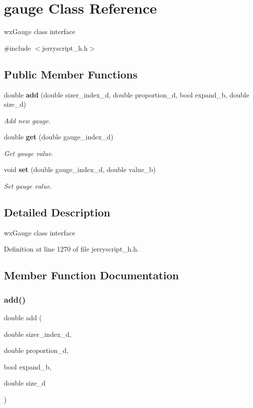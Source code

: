 \section{gauge Class Reference}
\label{classgauge}


wx\+Gauge class interface  




{\ttfamily \#include $<$jerryscript\+\_\+h.\+h$>$}

\subsection*{Public Member Functions}
\begin{DoxyCompactItemize}
\item 
double \textbf{ add} (double sizer\+\_\+index\+\_\+d, double proportion\+\_\+d, bool expand\+\_\+b, double size\+\_\+d)
\begin{DoxyCompactList}\small\item\em Add new gauge. \end{DoxyCompactList}\item 
double \textbf{ get} (double gauge\+\_\+index\+\_\+d)
\begin{DoxyCompactList}\small\item\em Get gauge value. \end{DoxyCompactList}\item 
void \textbf{ set} (double gauge\+\_\+index\+\_\+d, double value\+\_\+b)
\begin{DoxyCompactList}\small\item\em Set gauge value. \end{DoxyCompactList}\end{DoxyCompactItemize}


\subsection{Detailed Description}
wx\+Gauge class interface 

Definition at line 1270 of file jerryscript\+\_\+h.\+h.



\subsection{Member Function Documentation}
\mbox{\label{classgauge_a7204c33db14bd49c561cd715852bf331}} 
\subsubsection{add()}
{\footnotesize\ttfamily double add (\begin{DoxyParamCaption}\item[{double}]{sizer\+\_\+index\+\_\+d,  }\item[{double}]{proportion\+\_\+d,  }\item[{bool}]{expand\+\_\+b,  }\item[{double}]{size\+\_\+d }\end{DoxyParamCaption})}



